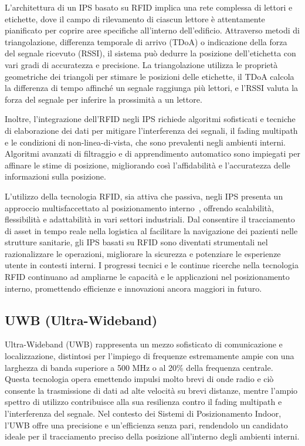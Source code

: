 L'architettura di un IPS basato su RFID implica una rete complessa di lettori e etichette, dove il campo di rilevamento di ciascun lettore è attentamente pianificato per coprire aree specifiche all'interno dell'edificio. Attraverso metodi di triangolazione, differenza temporale di arrivo (TDoA) o indicazione della forza del segnale ricevuto (RSSI), il sistema può dedurre la posizione dell'etichetta con vari gradi di accuratezza e precisione. La triangolazione utilizza le proprietà geometriche dei triangoli per stimare le posizioni delle etichette, il TDoA calcola la differenza di tempo affinché un segnale raggiunga più lettori, e l'RSSI valuta la forza del segnale per inferire la prossimità a un lettore.

Inoltre, l'integrazione dell'RFID negli IPS richiede algoritmi sofisticati e tecniche di elaborazione dei dati per mitigare l'interferenza dei segnali, il fading multipath e le condizioni di non-linea-di-vista, che sono prevalenti negli ambienti interni. Algoritmi avanzati di filtraggio e di apprendimento automatico sono impiegati per affinare le stime di posizione, migliorando così l'affidabilità e l'accuratezza delle informazioni sulla posizione.

L'utilizzo della tecnologia RFID, sia attiva che passiva, negli IPS presenta un approccio multisfaccettato al posizionamento interno~\cite{habaebi2020mobile}, offrendo scalabilità, flessibilità e adattabilità in vari settori industriali. Dal consentire il tracciamento di asset in tempo reale nella logistica al facilitare la navigazione dei pazienti nelle strutture sanitarie, gli IPS basati su RFID sono diventati strumentali nel razionalizzare le operazioni, migliorare la sicurezza e potenziare le esperienze utente in contesti interni. I progressi tecnici e le continue ricerche nella tecnologia RFID continuano ad ampliarne le capacità e le applicazioni nel posizionamento interno, promettendo efficienze e innovazioni ancora maggiori in futuro.

\subsection{UWB (Ultra-Wideband)}
\hspace{\parindent}Ultra-Wideband (UWB) rappresenta un mezzo sofisticato di comunicazione e localizzazione, distintosi per l'impiego di frequenze estremamente ampie con una larghezza di banda superiore a 500 MHz o al 20\% della frequenza centrale. Questa tecnologia opera emettendo impulsi molto brevi di onde radio e ciò consente la trasmissione di dati ad alte velocità su brevi distanze, mentre l'ampio spettro di utilizzo contribuisce alla sua resilienza contro il fading multipath e l'interferenza del segnale. Nel contesto dei Sistemi di Posizionamento Indoor, l'UWB offre una precisione e un'efficienza senza pari, rendendolo un candidato ideale per il tracciamento preciso della posizione all'interno degli ambienti interni.

